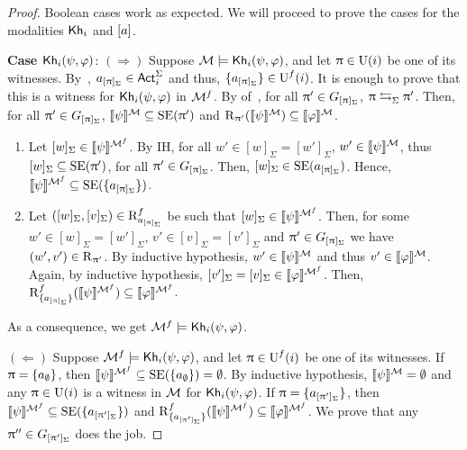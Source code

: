 \begin{proof}
Boolean cases work as expected. We will proceed to prove the cases for the modalities ${\sf Kh}_i$ and $[a]$.
\smallskip

\noindent
\textbf{Case ${\sf Kh}_i(\psi,\varphi)$}:
$(\Rightarrow)$ Suppose $\mathcal{M} \models {\sf Kh}_i(\psi,\varphi)$, and let $\uppi \in \operatorname{U}(i)$ be one of its witnesses.
By~, $a_{[\uppi]_\Sigma} \in {\rm \sf Act}^\Sigma_i$ and thus, $\{ a_{[\uppi]_\Sigma} \} \in \operatorname{U}^f(i)$. It is enough to prove that this is a witness for $ {\sf Kh}_i(\psi,\varphi)$ in $\mathcal{M}^f$. 
By  of~, for all $\uppi' \in G_{[\uppi]_\Sigma}$, $\uppi \mathrel{\leftrightarrows}_\Sigma \uppi'$.
Then, for all $\uppi' \in G_{[\uppi]_\Sigma}$, $\llbracket \psi \rrbracket^{\mathcal{M}} \subseteq \operatorname{SE}(\uppi')$ and $\operatorname{R}_{\uppi'}(\llbracket \psi \rrbracket^{\mathcal{M}}) \subseteq \llbracket \varphi \rrbracket^{\mathcal{M}}$.
    \begin{enumerate}
        \item Let $[w]_\Sigma \in \llbracket \psi \rrbracket^{\mathcal{M}^f}$. By IH, for all $w' \in [w]_\Sigma = [w']_\Sigma$, $w' \in \llbracket \psi \rrbracket^{\mathcal{M}}$,  thus $[w]_\Sigma \subseteq \operatorname{SE}(\uppi')$, for all $\uppi' \in G_{[\uppi]_\Sigma}$.
        Then, $[w]_\Sigma \in \operatorname{SE}(a_{[\uppi]_\Sigma})$. Hence, $\llbracket \psi \rrbracket^{\mathcal{M}^f} \subseteq \operatorname{SE}(\{ a_{[\uppi]_\Sigma} \})$.

        \item Let $([w]_\Sigma,[v]_\Sigma) \in \operatorname{R}^f_{a_{[\uppi]_\Sigma}}$ be such that $[w]_\Sigma \in \llbracket \psi \rrbracket^{\mathcal{M}^f}$.
        Then, for some $w' \in [w]_\Sigma = [w']_\Sigma$, $v' \in [v]_\Sigma = [v']_\Sigma$ and $\uppi' \in G_{[\uppi]_\Sigma}$ we have $(w',v') \in \operatorname{R}_{\uppi'}$.
        By inductive hypothesis, $w' \in \llbracket \psi \rrbracket^{\mathcal{M}}$ and thus $v' \in \llbracket \varphi \rrbracket^{\mathcal{M}}$.
        Again, by inductive hypothesis, $[v']_\Sigma = [v]_\Sigma \in \llbracket \varphi \rrbracket^{\mathcal{M}^f}$.
        Then, $\operatorname{R}^f_{\{ a_{[\uppi]_\Sigma} \}}(\llbracket \psi \rrbracket^{\mathcal{M}^f}) \subseteq \llbracket \varphi \rrbracket^{\mathcal{M}^f}$.
    \end{enumerate}

As a consequence, we get $\mathcal{M}^f \models {\sf Kh}_i(\psi,\varphi)$.

$(\Leftarrow)$ Suppose $\mathcal{M}^f \models {\sf Kh}_i(\psi,\varphi)$, and let $\uppi \in \operatorname{U}^f(i)$ be one of its witnesses. 
If $\uppi = \{ a_\emptyset \}$, then $\llbracket \psi \rrbracket^{\mathcal{M}^f} \subseteq \operatorname{SE}(\{ a_\emptyset \}) = \emptyset$.
By inductive hypothesis, $\llbracket \psi \rrbracket^{\mathcal{M}} = \emptyset$ and any $\uppi \in \operatorname{U}(i)$ is a witness in $\mathcal{M}$ for ${\sf Kh}_i(\psi,\varphi)$. 
If $\uppi = \{ a_{[\uppi']_{\Sigma}} \}$, then $\llbracket \psi \rrbracket^{\mathcal{M}^f} \subseteq \operatorname{SE}(\{ a_{[\uppi']_\Sigma} \})$ and $\operatorname{R}^f_{\{ a_{[\uppi']_\Sigma} \}}(\llbracket \psi \rrbracket^{\mathcal{M}^f}) \subseteq \llbracket \varphi \rrbracket^{\mathcal{M}^f}$.
We prove that any $\uppi'' \in G_{[\uppi']_\Sigma}$ does the job.


\end{proof}
